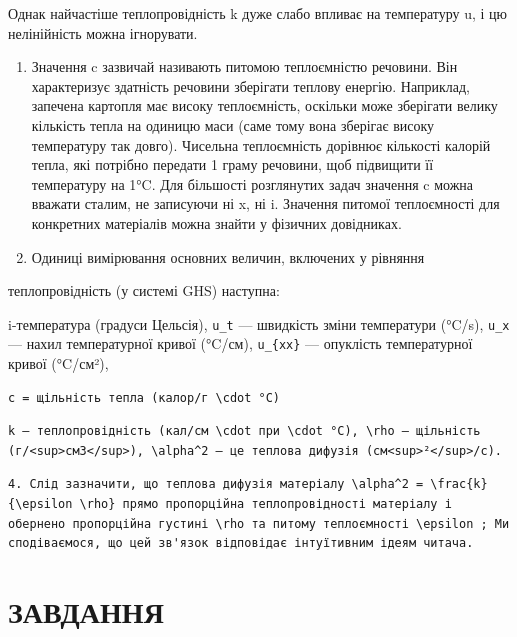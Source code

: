 \documentclass[
  ukrainian,
]{article}
\begin{document}
Однак найчастіше теплопровідність k дуже слабо впливає на температуру u,
і цю нелінійність можна ігнорувати.

\begin{enumerate}
\def\labelenumi{\arabic{enumi}.}
\setcounter{enumi}{1}
\item
  Значення c зазвичай називають питомою теплоємністю речовини. Він
  характеризує здатність речовини зберігати теплову енергію. Наприклад,
  запечена картопля має високу теплоємність, оскільки може зберігати
  велику кількість тепла на одиницю маси (саме тому вона зберігає високу
  температуру так довго). Чисельна теплоємність дорівнює кількості
  калорій тепла, які потрібно передати 1 граму речовини, щоб підвищити
  її температуру на 1°C. Для більшості розглянутих задач значення c
  можна вважати сталим, не записуючи ні x, ні i. Значення питомої
  теплоємності для конкретних матеріалів можна знайти у фізичних
  довідниках.
\item
  Одиниці вимірювання основних величин, включених у рівняння
\end{enumerate}

теплопровідність (у системі GHS) наступна:

i-температура (градуси Цельсія), \texttt{u\_t} --- швидкість зміни
температури (°C/s), \texttt{u\_x} --- нахил температурної кривої
(°C/см), \texttt{u\_\{xx\}} --- опуклість температурної кривої (°C/см²),

\begin{verbatim}
c = щільність тепла (калор/г \cdot °C)
\end{verbatim}

\begin{verbatim}
k — теплопровідність (кал/см \cdot при \cdot °C), \rho — щільність (г/<sup>см3</sup>), \alpha^2 — це теплова дифузія (см<sup>²</sup>/с).
\end{verbatim}

\begin{verbatim}
4. Слід зазначити, що теплова дифузія матеріалу \alpha^2 = \frac{k}{\epsilon \rho} прямо пропорційна теплопровідності матеріалу і обернено пропорційна густині \rho та питому теплоємності \epsilon ; Ми сподіваємося, що цей зв'язок відповідає інтуїтивним ідеям читача.
\end{verbatim}

\section{ЗАВДАННЯ}\label{ux437ux430ux432ux434ux430ux43dux43dux44f-3}
\end{document}
